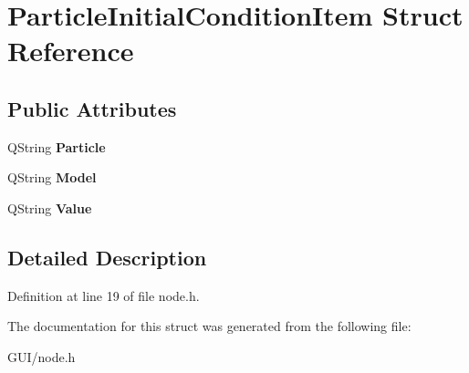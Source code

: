 \hypertarget{struct_particle_initial_condition_item}{}\section{Particle\+Initial\+Condition\+Item Struct Reference}
\label{struct_particle_initial_condition_item}
\subsection*{Public Attributes}
\begin{DoxyCompactItemize}
\item 
\mbox{\label{struct_particle_initial_condition_item_a3f083acb834c10757b4293899ea87d77}} 
Q\+String {\bfseries Particle}
\item 
\mbox{\label{struct_particle_initial_condition_item_ae31481bbe54caac7508fff477851155e}} 
Q\+String {\bfseries Model}
\item 
\mbox{\label{struct_particle_initial_condition_item_af216732bf327eb76cb08973af803d25f}} 
Q\+String {\bfseries Value}
\end{DoxyCompactItemize}


\subsection{Detailed Description}


Definition at line 19 of file node.\+h.



The documentation for this struct was generated from the following file\+:\begin{DoxyCompactItemize}
\item 
G\+U\+I/node.\+h\end{DoxyCompactItemize}
